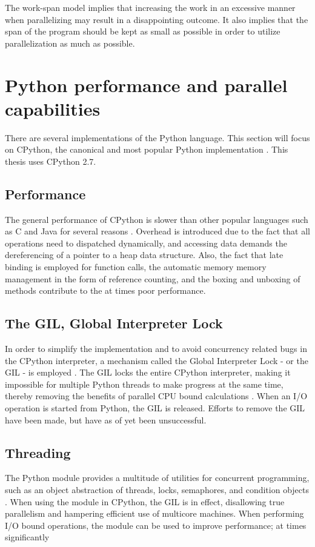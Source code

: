 The work-span model implies that increasing the work in an excessive manner when parallelizing may result in a disappointing
outcome. It also implies that the span of the program should be kept as small as possible in order to utilize parallelization as
much as possible.

\section{Python performance and parallel capabilities}
There are several implementations of the Python language. This section will focus on CPython, the canonical and most popular
Python implementation \cite{pythonimplementations_ppw}. This thesis uses CPython 2.7.

\subsection{Performance}
The general performance of CPython is slower than other popular languages such as C and Java for several
reasons \cite{barany_2014_python_pipd}. Overhead is introduced due to the fact that all operations need to dispatched dynamically,
and accessing data demands the dereferencing of a pointer to a heap data structure. Also, the fact that late binding is employed
for function calls, the automatic memory memory management in the form of reference counting, and the boxing and unboxing of
methods contribute to the at times poor performance.

\subsection{The GIL, Global Interpreter Lock}
In order to simplify the implementation and to avoid concurrency related bugs in the CPython interpreter,
a mechanism called the Global Interpreter Lock - or the GIL - is employed  \cite{palach_2014_parallel_ppwp}.
The GIL locks the entire CPython interpreter, making it impossible for multiple Python threads to make progress at
the same time, thereby removing the benefits of parallel CPU bound calculations
\cite{glossary_gp2d}. When an I/O operation is started from Python, the GIL is released.
Efforts to remove the GIL have been made, but have as of yet been unsuccessful.

\subsection{Threading}
The Python  module provides a multitude of utilities for concurrent programming, such as an object abstraction of
threads, locks, semaphores, and condition objects \cite{16_1thtip2d}. When using the  module in CPython, the GIL is in
effect, disallowing true parallelism and hampering efficient use of multicore machines. When performing I/O bound operations, the
 module can be used to improve performance; at times significantly \cite[p. 121-124]{slatkin_2015_effective_ep5swtwbp}

